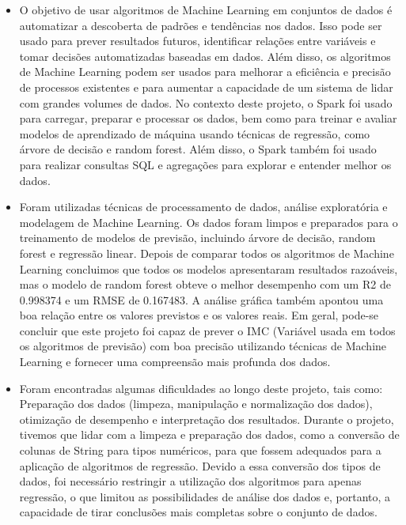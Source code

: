 \documentclass[11pt]{article}
\providecommand{\tightlist}{%
      \setlength{\itemsep}{0pt}\setlength{\parskip}{0pt}}
\begin{document}
    \begin{itemize}
\tightlist
\item
O objetivo de usar algoritmos de Machine Learning em conjuntos de dados é automatizar a descoberta de padrões e tendências nos dados. Isso pode ser usado para prever resultados futuros, identificar relações entre variáveis e tomar decisões automatizadas baseadas em dados. Além disso, os algoritmos de Machine Learning podem ser usados para melhorar a eficiência e precisão de processos existentes e para aumentar a capacidade de um sistema de lidar com grandes volumes de dados.
No contexto deste projeto, o Spark foi usado para carregar, preparar e processar os dados, bem como para treinar e avaliar modelos de aprendizado de máquina usando técnicas de regressão, como árvore de decisão e random forest. Além disso, o Spark também foi usado para realizar consultas SQL e agregações para explorar e entender melhor os dados.
\newline
\item
Foram utilizadas técnicas de processamento de dados, análise exploratória e modelagem de Machine Learning. Os dados foram limpos e preparados para o treinamento de modelos de previsão, incluindo árvore de decisão, random forest e regressão linear.
Depois de comparar todos os algoritmos de Machine Learning concluimos que todos os modelos apresentaram resultados razoáveis, mas o modelo de random forest obteve o melhor desempenho com um R2 de 0.998374 e um RMSE de 0.167483. A análise gráfica também apontou uma boa relação entre os valores previstos e os valores reais. Em geral, pode-se concluir que este projeto foi capaz de prever o IMC (Variável usada em todos os algoritmos de previsão) com boa precisão utilizando técnicas de Machine Learning e fornecer uma compreensão mais profunda dos dados.
\newline
\item
Foram encontradas algumas dificuldades ao longo deste projeto, tais como: 
\newline Preparação dos dados (limpeza, manipulação e normalização dos dados), otimização de desempenho e interpretação dos resultados.
Durante o projeto, tivemos que lidar com a limpeza e preparação dos dados, como a conversão de colunas de String para tipos numéricos, para que fossem adequados para a aplicação de algoritmos de regressão.
Devido a essa conversão dos tipos de dados, foi necessário restringir a utilização dos algoritmos para apenas regressão, o que limitou as possibilidades de análise dos dados e, portanto, a capacidade de tirar conclusões mais completas sobre o conjunto de dados.
\end{itemize}
\end{document}
